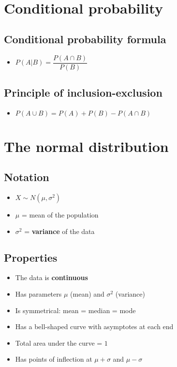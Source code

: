 


\chapter{Conditional probability}
\section{Conditional probability formula}
\begin{itemize}
	\item $P(A|B) = \dfrac{P(A \cap B)}{P(B)}$
\end{itemize}
\section{Principle of inclusion-exclusion}
\begin{itemize}
	\item $P(A\cup B)=P(A)+P(B)-P(A\cap B)$
\end{itemize}

\chapter{The normal distribution}
\section{Notation}
\begin{itemize}
	\item $X \sim N(\mu,\sigma^2)$
	\item $\mu$ = mean of the population
	\item $\sigma^2$ = \textbf{variance} of the data
\end{itemize}
\section{Properties}
\begin{itemize}
	\item The data is \textbf{continuous}
	\item Has parameters $\mu$ (mean) and $\sigma^2$ (variance)
	\item Is symmetrical: mean = median = mode
	\item Has a bell-shaped curve with asymptotes at each end
	\item Total area under the curve = $1$
	\item Has points of inflection at $\mu+\sigma$ and $\mu-\sigma$
\end{itemize}

